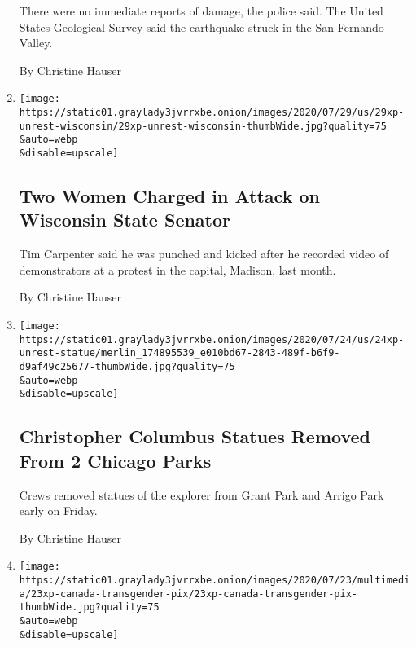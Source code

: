 \begin{enumerate}
  There were no immediate reports of damage, the police said. The United
  States Geological Survey said the earthquake struck in the San
  Fernando Valley.

  By Christine Hauser
\item
  \href{/2020/07/29/us/wisconsin-tim-carpenter-attacked.html}{}

  \texttt{[image: https://static01.graylady3jvrrxbe.onion/images/2020/07/29/us/29xp-unrest-wisconsin/29xp-unrest-wisconsin-thumbWide.jpg?quality=75\\\&auto=webp\\\&disable=upscale]}

  \hypertarget{two-women-charged-in-attack-on-wisconsin-state-senator}{%
  \subsection{Two Women Charged in Attack on Wisconsin State
  Senator}\label{two-women-charged-in-attack-on-wisconsin-state-senator}}

  Tim Carpenter said he was punched and kicked after he recorded video
  of demonstrators at a protest in the capital, Madison, last month.

  By Christine Hauser
\item
  \href{/2020/07/24/us/christopher-columbus-chicago.html}{}

  \texttt{[image: https://static01.graylady3jvrrxbe.onion/images/2020/07/24/us/24xp-unrest-statue/merlin\_174895539\_e010bd67-2843-489f-b6f9-d9af49c25677-thumbWide.jpg?quality=75\\\&auto=webp\\\&disable=upscale]}

  \hypertarget{christopher-columbus-statues-removed-from-2-chicago-parks}{%
  \subsection{Christopher Columbus Statues Removed From 2 Chicago
  Parks}\label{christopher-columbus-statues-removed-from-2-chicago-parks}}

  Crews removed statues of the explorer from Grant Park and Arrigo Park
  early on Friday.

  By Christine Hauser
\item
  \href{/2020/07/23/world/canada/junia-joplin-transgender-lorne-park-baptist.html}{}

  \texttt{[image: https://static01.graylady3jvrrxbe.onion/images/2020/07/23/multimedia/23xp-canada-transgender-pix/23xp-canada-transgender-pix-thumbWide.jpg?quality=75\\\&auto=webp\\\&disable=upscale]}

  \hypertarget{baptist-pastor-is-fired-after-coming-out-as-transgender}{%
}
\end{enumerate}
